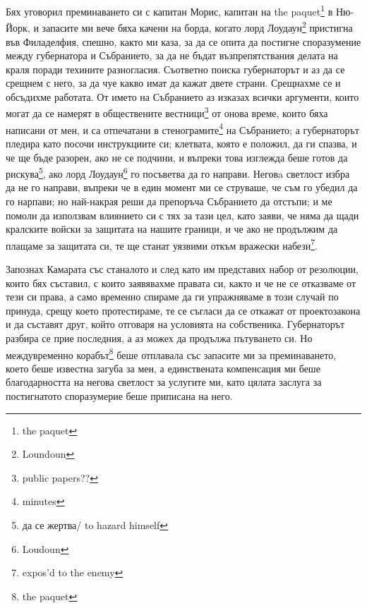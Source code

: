 \documentclass[12pt]{book}
\begin{document}
Бях уговорил преминаването си с капитан Морис, капитан на the paquet\footnote{the paquet} в Ню-Йорк, и запасите ми вече бяха качени на борда, когато лорд Лоудаун\footnote{Loundoun} пристигна във Филаделфия, спешно, както ми каза, за да се опита да постигне споразумение между губернатора и Събранието, за да не бъдат възпрепятствания делата на краля поради техините разногласия. Съответно поиска губернаторът и аз да се срещнем с него, за да чуе какво имат да кажат двете страни. Срещнахме се и обсъдихме работата. От името на Събранието аз изказах всички аргументи, които могат да се намерят в обществените вестници\footnote{public papers??} от онова време, които бяха написани от мен, и са отпечатани в стенограмите\footnote{minutes} на Събранието; а губернаторът пледира като посочи инструкциите си; клетвата, която е положил, да ги спазва, и че ще бъде разорен, ако не се подчини, и въпреки това изглежда беше готов да рискува\footnote{да се жертва/ to hazard himself}, ако лорд Лоудаун\footnote{Loudoun} го посъветва да го направи. Неговa светлост избра да не го направи, въпреки че в един момент ми се струваше, че съм го убедил да го нарпави; но най-накрая реши да препоръча Събранието да отстъпи; и ме помоли да използвам влиянието си с тях за тази цел, като заяви, че няма да щади кралските войски за защитата на нашите граници, и че ако не продължим да плащаме за защитата си, те ще станат уязвими откъм вражески набези\footnote{expos'd to the enemy}.

Запознах Камарата със станалото и след като им представих набор от резолюции, които бях съставил, с които заявявахме правата си, както и че не се отказваме от тези си права, а само временно спираме да ги упражняваме в този случай по принуда, срещу което протестираме, те се съгласи да се откажат от проектозакона и да съставят друг, който отговаря на условията на собственика. Губернаторът разбира се прие последния, а аз можех да продължа пътуването си. Но междувременно корабът\footnote{the paquet} беше отплавала със запасите ми за преминаването, което беше известна загуба за мен, а единствената компенсация ми беше благодарността на негова светлост за услугите ми, като цялата заслуга за постигнатото споразумерие беше приписана на него.
\end{document}
